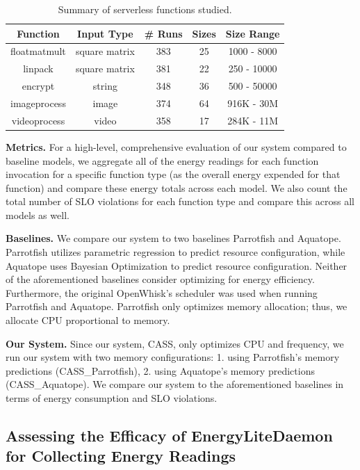 \documentclass[times, 10pt,twocolumn]{article}
\begin{document}
\begin{table}[htbp]
  \centering
  \begin{tabular}{|c|c|c|c|c|}
  \hline
  \textbf{Function} & \textbf{Input Type} & \textbf{\# Runs} & \textbf{Sizes} & \textbf{Size Range} \\ \hline
  floatmatmult & square matrix & 383 & 25 & 1000 - 8000 \\ \hline
  linpack & square matrix & 381 & 22 & 250 - 10000 \\ \hline
  encrypt & string & 348 & 36 & 500 - 50000 \\ \hline
  imageprocess & image & 374 & 64 & 916K - 30M \\ \hline
  videoprocess & video & 358 & 17 & 284K - 11M \\ \hline
  \end{tabular}
  \caption{Summary of serverless functions studied.}
  \label{tab:summary_of_serverless_functions}
\end{table}

\textbf{Metrics.} For a high-level, comprehensive evaluation of our system compared to baseline models, we aggregate all of the energy readings for each function invocation for a specific function type (as the overall energy expended for that function) and compare these energy totals across each model. We also count the total number of SLO violations for each function type and compare this across all models as well.

\textbf{Baselines.} We compare our system to two baselines Parrotfish and Aquatope. Parrotfish \cite{parrotfish} utilizes parametric regression to predict resource configuration, while Aquatope \cite{aquatope} uses Bayesian Optimization to predict resource configuration. Neither of the aforementioned baselines consider optimizing for energy efficiency. Furthermore, the original OpenWhisk's scheduler was used when running Parrotfish and Aquatope. Parrotfish only optimizes memory allocation; thus, we allocate CPU proportional to memory. 

\textbf{Our System.} Since our system, CASS, only optimizes CPU and frequency, we run our system with two memory configurations: 1. using Parrotfish's memory predictions (CASS\_Parrotfish), 2. using Aquatope's memory predictions (CASS\_Aquatope). We compare our system to the aforementioned baselines in terms of energy consumption and SLO violations.

\subsection{Assessing the Efficacy of EnergyLiteDaemon for Collecting Energy Readings}
\end{document}
